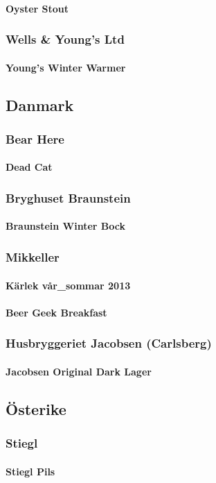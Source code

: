 \documentclass[11pt]{article}
\begin{document}
\paragraph{Oyster Stout}
\label{sec:org2818551}
\subsubsection{Wells \& Young's Ltd}
\label{sec:org864f557}
\paragraph{Young's Winter Warmer}
\label{sec:orgf713d1a}
\subsection{Danmark}
\label{sec:org376a508}
\subsubsection{Bear Here}
\label{sec:org215584e}
\paragraph{Dead Cat}
\label{sec:orgbdf3277}
\subsubsection{Bryghuset Braunstein}
\label{sec:org2b901b6}
\paragraph{Braunstein Winter Bock}
\label{sec:org011eea9}
\subsubsection{Mikkeller}
\label{sec:orgcf73a09}
\paragraph{Kärlek vår\_sommar 2013}
\label{sec:org0a62f6f}
\paragraph{Beer Geek Breakfast}
\label{sec:orgffcdfcb}
\subsubsection{Husbryggeriet Jacobsen (Carlsberg)}
\label{sec:org46dc1fb}
\paragraph{Jacobsen Original Dark Lager}
\label{sec:org83a0132}
\subsection{Österike}
\label{sec:org52690b5}
\subsubsection{Stiegl}
\label{sec:orga42bb47}
\paragraph{Stiegl Pils}
\label{sec:org7ba4721}
\end{document}
